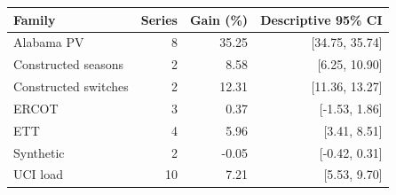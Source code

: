 \begin{tabular}{lrrr}
\toprule
Family & Series & Gain (\%) & Descriptive 95\% CI \\
\midrule
Alabama PV & 8 & 35.25 & [34.75, 35.74] \\
Constructed seasons & 2 & 8.58 & [6.25, 10.90] \\
Constructed switches & 2 & 12.31 & [11.36, 13.27] \\
ERCOT & 3 & 0.37 & [-1.53, 1.86] \\
ETT & 4 & 5.96 & [3.41, 8.51] \\
Synthetic & 2 & -0.05 & [-0.42, 0.31] \\
UCI load & 10 & 7.21 & [5.53, 9.70] \\
\bottomrule
\end{tabular}